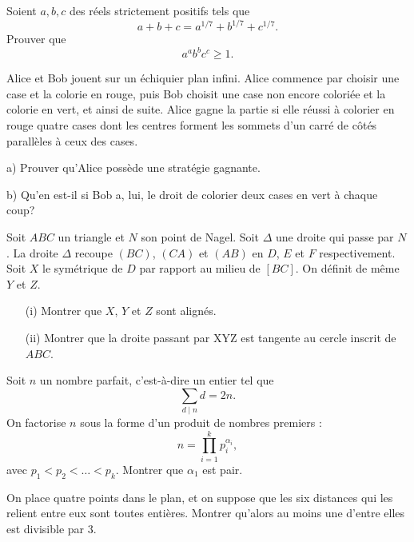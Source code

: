 \begin{exo}{}
Soient $a,b,c$ des réels strictement positifs tels que
$$a+b+c=a^{1/7}+b^{1/7}+c^{1/7}.$$
Prouver que $$a^{a} b^{b} c^{c} \geq 1.$$
\end{exo}


\begin{exo}{  }
Alice et Bob jouent sur un \'{e}chiquier plan infini. Alice commence par
choisir une case et la colorie en rouge, puis Bob choisit une case non
encore colori\'{e}e et la colorie en vert, et ainsi de suite. Alice gagne la
partie si elle r\'{e}ussi \`{a} colorier en rouge quatre cases  dont les
centres forment les sommets d'un carr\'{e} de c\^{o}t\'{e}s parall\`{e}les
\`{a} ceux des cases.

a) Prouver qu'Alice poss\`{e}de une strat\'{e}gie gagnante.

b) Qu'en est-il si Bob a, lui, le droit de colorier deux cases en vert \`{a}
chaque coup?
\end{exo}

\begin{exo}{}
Soit $ABC$ un triangle et $N$ son point de Nagel. Soit $\Delta$ une droite qui passe par $N$. La droite $\Delta$ recoupe $(BC)$, $(CA)$ et $(AB)$ en $D$, $E$ et $F$ respectivement. Soit $X$ le symétrique de $D$ par rapport au milieu de $[BC]$. On définit de même $Y$ et $Z$. 
\begin{enumerate}
\item[(i)] Montrer que $X$, $Y$ et $Z$ sont alignés.
\item[(ii)] Montrer que la droite passant par XYZ est tangente au cercle inscrit de $ABC$.
\end{enumerate}
\end{exo}

\begin{exo}{}
Soit $n$ un nombre parfait, c'est-à-dire un entier tel que
\[\sum_{d\mid n}d = 2n.\]
On factorise $n$ sous la forme d'un produit de nombres premiers :
\[n =\prod_{i=1}^k p_i^{\alpha_i},\]
avec $p_1 < p_2 < \ldots < p_k$. Montrer que $\alpha_1$ est pair.
\end{exo}


\begin{exo}{}
On place quatre points dans le plan, et on suppose que les six distances qui les relient entre eux sont toutes entières. Montrer qu'alors au moins une d'entre elles est divisible par 3.
\end{exo}

